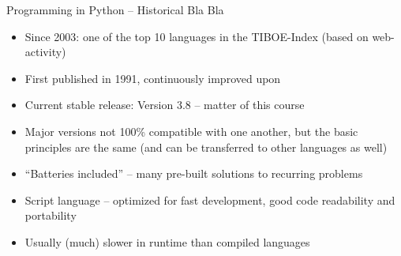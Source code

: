 \begin{frame}{Programming in Python -- Historical Bla Bla}
%
\begin{itemize}
\item Since 2003: one of the top 10 languages in the TIBOE-Index (based on web-activity)
\item First published in 1991, continuously improved upon
\item Current stable release: Version 3.8 -- matter of this course
\item Major versions not 100\% compatible with one another, but the basic principles are the same (and can be transferred to other languages as well)
\item \enquote{Batteries included} -- many pre-built solutions to recurring problems
\item Script language -- optimized for fast development, good code readability and portability
\item Usually (much) slower in runtime than compiled languages
\end{itemize}
%
\end{frame}


